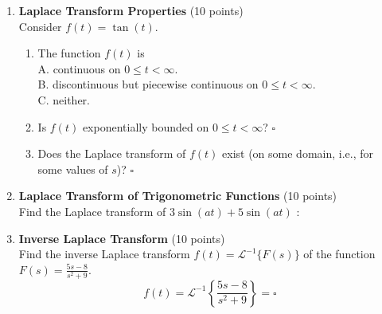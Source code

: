 \begin{enumerate}
  \item \textbf{Laplace Transform Properties} (10 points)\\
  Consider $f(t)=\tan (t)$.
  \begin{enumerate}[label=(\alph*)]
    \item The function $f(t)$ is\\
    A. continuous on $0 \leq t<\infty$.\\
    B. discontinuous but piecewise continuous on $0 \leq t<\infty$.\\
    C. neither.\\
    \begin{subanswer}
    \end{subanswer}
    \item Is $f(t)$ exponentially bounded on $0 \leq t<\infty$? $\square$\\
    \begin{subanswer}
    \end{subanswer}
    \item Does the Laplace transform of $f(t)$ exist (on some domain, i.e., for some values of $s$)? $\square$\\
    \begin{subanswer}
    \end{subanswer}
  \end{enumerate}

  \item \textbf{Laplace Transform of Trigonometric Functions} (10 points)\\
  Find the Laplace transform of $3 \sin (a t)+5 \sin (a t)$ :\\
  \begin{subanswer}
  \end{subanswer}

  \newpage

  \item \textbf{Inverse Laplace Transform} (10 points)\\
  Find the inverse Laplace transform $f(t)=\mathcal{L}^{-1}\{F(s)\}$ of the function $F(s)=\frac{5 s-8}{s^2+9}$.
  $$
  f(t)=\mathcal{L}^{-1}\left\{\frac{5 s-8}{s^2+9}\right\}=\square
  $$
  \begin{subanswer}
  \end{subanswer}


\end{enumerate}
